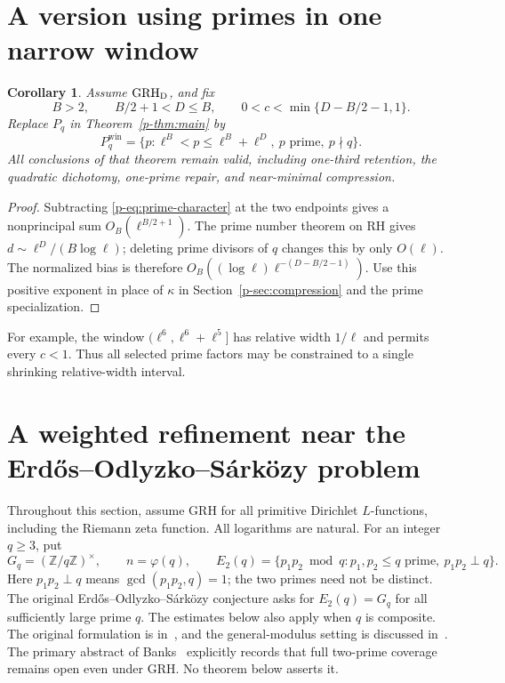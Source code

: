 \documentclass[11pt,a4paper]{article}
\newtheorem{corollary}[theorem]{Corollary}
\theoremstyle{definition}
\theoremstyle{remark}
\begin{document}
\section{A version using primes in one narrow window}
\begin{corollary}\label{p-cor:window}
Assume $\mathrm{GRH}_{\mathrm D}$, and fix
\[
 B>2,\qquad B/2+1<D\le B,\qquad
 0<c<\min\{D-B/2-1,1\}.
\]
Replace $P_q$ in Theorem~\ref{p-thm:main} by
\[
 P_q^{\mathrm{win}}=
 \{p:\ell^B<p\le\ell^B+\ell^D,\ p\text{ prime},\ p\nmid q\}.
\]
All conclusions of that theorem remain valid, including one-third
retention, the quadratic dichotomy, one-prime repair, and near-minimal
compression.
\end{corollary}
\begin{proof}
Subtracting \eqref{p-eq:prime-character} at the two endpoints gives a
nonprincipal sum $O_B(\ell^{B/2+1})$. The prime number theorem on RH
gives
$d\sim\ell^D/(B\log\ell)$; deleting prime divisors of $q$ changes
this by only $O(\ell)$. The normalized bias is therefore
$O_B((\log\ell)\ell^{-(D-B/2-1)})$.
Use this positive exponent in place of $\kappa$ in
Section~\ref{p-sec:compression} and the prime specialization.
\end{proof}
For example, the window
$(\ell^6,\ell^6+\ell^5]$ has relative width $1/\ell$ and permits
every $c<1$. Thus all selected prime factors may be constrained to a
single shrinking relative-width interval.



\section{A weighted refinement near the Erd\H{o}s--Odlyzko--S\'ark\"ozy problem}

Throughout this section, assume GRH for all primitive Dirichlet
$L$-functions, including the Riemann zeta function. All logarithms are
natural. For an integer $q\geq3$, put
\[
 G_q=(\mathbb Z/q\mathbb Z)^\times,
 \qquad n=\varphi(q),
 \qquad
 E_2(q)=\{p_1p_2\bmod q:p_1,p_2\leq q\text{ prime},\ p_1p_2\perp q\}.
\]
Here $p_1p_2\perp q$ means $\gcd(p_1p_2,q)=1$; the two primes need not
be distinct. The original Erd\H{o}s--Odlyzko--S\'ark\"ozy conjecture asks
for $E_2(q)=G_q$ for all sufficiently large prime $q$.
The estimates below also apply when $q$ is composite. The original
formulation is in~\cite{p-EOS1987}, and the general-modulus setting is
discussed in~\cite{p-Szabo2024}. The primary abstract of
Banks~\cite{p-Banks2026} explicitly records that full two-prime
coverage remains open even under GRH. No theorem below asserts it.
\end{document}
